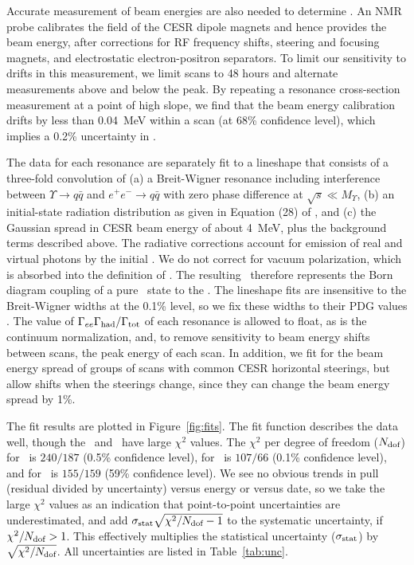 \documentclass[aps,prl,twocolumn,superscriptaddress,showpacs,floatfix]{revtex4}
\begin{document}
Accurate measurement of beam energies are also needed to determine
\gee.  An NMR probe calibrates the field of the CESR dipole magnets
and hence provides the beam energy, after corrections for RF frequency
shifts, steering and focusing magnets, and electrostatic
electron-positron separators.  To limit our sensitivity to drifts in
this measurement, we limit scans to 48 hours and alternate
measurements above and below the peak.  By repeating a resonance
cross-section measurement at a point of high slope, we find that the
beam energy calibration drifts by less than 0.04~MeV within a scan (at
68\% confidence level), which implies a 0.2\% uncertainty in \gee.

The data for each resonance are separately fit to a lineshape that
consists of a three-fold convolution of (a) a Breit-Wigner resonance
including interference between $\Upsilon \to q\bar{q}$ and $e^+e^- \to
q\bar{q}$ with zero phase difference at $\sqrt{s} \ll M_\Upsilon$, (b)
an initial-state radiation distribution as given in Equation (28) of
\cite{kf}, and (c) the Gaussian spread in CESR beam energy of about
4~MeV, plus the background terms described above.  The radiative
corrections account for emission of real and virtual photons by the
initial \ee.  We do not correct for vacuum polarization, which is
absorbed into the definition of \gee.  The resulting \gee\ therefore
represents the Born diagram coupling of a pure \ee\ state to the \ups.
The lineshape fits are insensitive to the Breit-Wigner widths at the
0.1\% level, so we fix these widths to their PDG values \cite{pdg}.
The value of $\Gamma_{ee}\Gamma_{\mbox{\scriptsize had}}/\Gamma_{\mbox{\scriptsize tot}}$ of each resonance is allowed to float, as is
the continuum normalization, and, to remove sensitivity to beam energy
shifts between scans, the peak energy of each scan.  In addition, we
fit for the beam energy spread of groups of scans with common CESR
horizontal steerings, but allow shifts when the steerings change,
since they can change the beam energy spread by 1\%.

The fit results are plotted in Figure~\ref{fig:fits}.  The fit
function describes the data well, though the \us\ and \uss\ have large
$\chi^2$ values.  The $\chi^2$ per degree of freedom
($N_{\mbox{\scriptsize dof}}$) for \us\ is $240/187$ (0.5\% confidence
level), for \uss\ is $107/66$ (0.1\% confidence level), and for \usss\
is $155/159$ (59\% confidence level).  We see no obvious trends in
pull (residual divided by uncertainty) versus energy or versus date,
so we take the large $\chi^2$ values as an indication that
point-to-point uncertainties are underestimated, and add
$\sigma_{\mbox{\scriptsize stat}}\sqrt{\chi^2/N_{\mbox{\scriptsize
dof}} - 1}$ to the systematic uncertainty, if
$\chi^2/N_{\mbox{\scriptsize dof}} > 1$.  This effectively multiplies
the statistical uncertainty ($\sigma_{\mbox{\scriptsize stat}}$) by
$\sqrt{\chi^2/N_{\mbox{\scriptsize dof}}}$.  All uncertainties are
listed in Table~\ref{tab:unc}.
\end{document}
